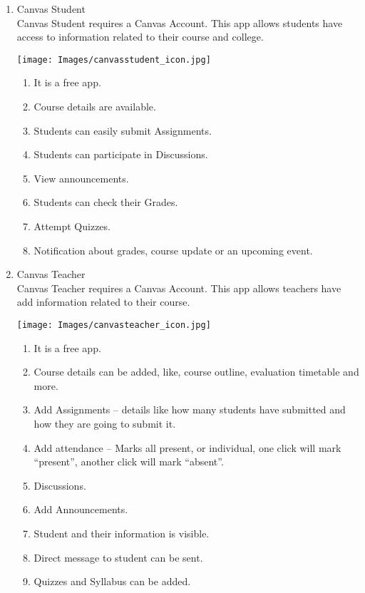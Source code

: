 \begin{enumerate}
   \item Canvas Student
   \\ Canvas Student requires a Canvas Account. This app allows students have access to information related to their course and college.
   \begin{center}
       \texttt{[image: Images/canvasstudent\_icon.jpg]}
   \end{center}
   \begin{enumerate}
       \item It is a free app.
       \item Course details are available.
       \item Students can easily submit Assignments.
       \item Students can participate in Discussions.
       \item View announcements.
       \item Students can check their Grades.
       \item Attempt Quizzes.
       \item Notification about grades, course update or an upcoming event.
   \end{enumerate}
   
   \item Canvas Teacher
   \\ Canvas Teacher requires a Canvas Account. This app allows teachers have add information related to their course.
   \begin{center}
       \texttt{[image: Images/canvasteacher\_icon.jpg]}
   \end{center}
   \begin{enumerate}
       \item It is a free app.
       \item Course details can be added, like, course outline, evaluation timetable and more.
       \item Add Assignments – details like how many students have submitted and how they are going to submit it.
       \item Add attendance – Marks all present, or individual, one click will mark “present”, another click will mark “absent”.
       \item Discussions.
       \item Add Announcements.
       \item Student and their information is visible.
       \item Direct message to student can be sent.
       \item Quizzes and Syllabus can be added.
   \end{enumerate}
   

\end{enumerate}
